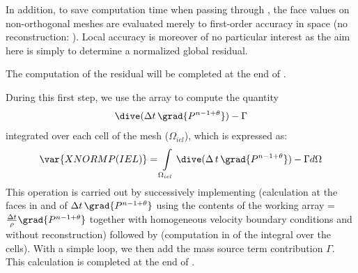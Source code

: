 In addition, to save computation time when passing through , the face values on non-orthogonal meshes are evaluated merely to first-order accuracy in space (no reconstruction: ). Local accuracy is moreover of no particular interest as the aim here is simply to determine a normalized global residual.

The computation of the residual will be completed at the end of .



During this first step, we use the array  to compute the quantity $$\dive(\Delta t \,\grad{P^{n-1+\theta}})-\Gamma$$ integrated over each cell  of the mesh ($\Omega_{iel}$), which is expressed as:
$$\var{XNORMP(IEL)}=\int\limits_{\Omega_{iel}}{\dive(\Delta\,t\,\grad{P^{n-1+\theta}})-\Gamma
d\Omega}$$
This operation is carried out by successively implementing 
(calculation at the faces in  and  of $\Delta t\,\grad{P^{n-1+\theta}}$ using the contents of the working array =$\frac{\Delta t}{\rho} \grad{P^{n-1+\theta}}$ together with homogeneous velocity boundary conditions and without reconstruction) followed by  (computation in  of the integral over the cells).  With a simple loop, we then add the mass source term contribution $\Gamma$.
This calculation is completed at the end of .\\


